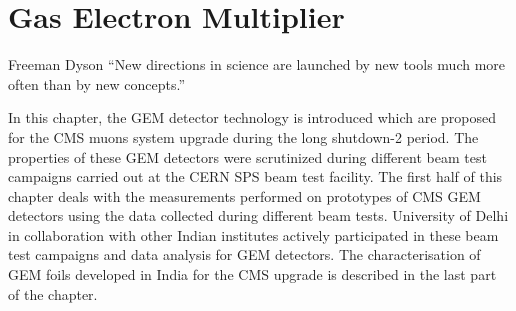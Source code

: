 \chapter{Gas Electron Multiplier} %
\label{cha:gas_electron_multiplier}
\begin{chapquote}
{Freeman Dyson}
``New directions in science are launched by new tools much more often than by new concepts.''
\end{chapquote}

In this chapter, the GEM detector technology is introduced which are proposed for the CMS muons system upgrade during the long shutdown-2 period. 
The properties of these GEM detectors were scrutinized during different beam test campaigns carried out at the CERN SPS beam test facility.
The first half of this chapter deals with the measurements performed on prototypes of CMS GEM detectors using the data collected during  different beam tests.
University of Delhi in collaboration with other Indian institutes actively participated in these beam test campaigns and data analysis for GEM detectors.
The characterisation of GEM foils developed in India for the CMS upgrade is described in the last part of the chapter.

